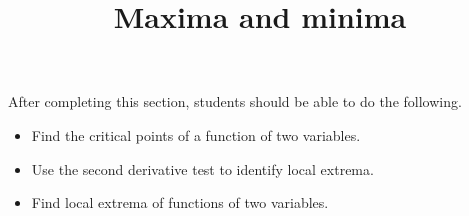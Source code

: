 \documentclass{ximera}
\title{Maxima and minima}
\begin{document}
\begin{abstract}
\end{abstract}

\maketitle

\begin{sectionOutcomes}

After completing this section, students should be able to do the following.

\begin{itemize}
\item Find the critical points of a function of two variables.
\item Use the second derivative test to identify local extrema.
\item Find local extrema of functions of two variables.
\end{itemize}

\end{sectionOutcomes}
\end{document}
